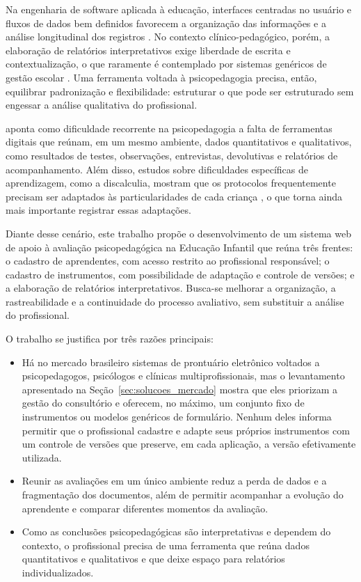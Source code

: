 Na engenharia de software aplicada à educação, interfaces centradas no usuário e fluxos de dados bem definidos favorecem a organização das informações e a análise longitudinal dos registros \cite{Lemes_Dias_Oliveira_2023}. No contexto clínico-pedagógico, porém, a elaboração de relatórios interpretativos exige liberdade de escrita e contextualização, o que raramente é contemplado por sistemas genéricos de gestão escolar \cite{junior2024_gestao_escolar}. Uma ferramenta voltada à psicopedagogia precisa, então, equilibrar padronização e flexibilidade: estruturar o que pode ser estruturado sem engessar a análise qualitativa do profissional.

 aponta como dificuldade recorrente na psicopedagogia a falta de ferramentas digitais que reúnam, em um mesmo ambiente, dados quantitativos e qualitativos, como resultados de testes, observações, entrevistas, devolutivas e relatórios de acompanhamento. Além disso, estudos sobre dificuldades específicas de aprendizagem, como a discalculia, mostram que os protocolos frequentemente precisam ser adaptados às particularidades de cada criança \cite{tavares2022_instrumentos_psicopedagogicos}, o que torna ainda mais importante registrar essas adaptações.

Diante desse cenário, este trabalho propõe o desenvolvimento de um sistema web de apoio à avaliação psicopedagógica na Educação Infantil que reúna três frentes: o cadastro de aprendentes, com acesso restrito ao profissional responsável; o cadastro de instrumentos, com possibilidade de adaptação e controle de versões; e a elaboração de relatórios interpretativos. Busca-se melhorar a organização, a rastreabilidade e a continuidade do processo avaliativo, sem substituir a análise do profissional.

O trabalho se justifica por três razões principais:

\begin{itemize}
    \item Há no mercado brasileiro sistemas de prontuário eletrônico voltados a psicopedagogos, psicólogos e clínicas multiprofissionais, mas o levantamento apresentado na Seção~\ref{sec:solucoes_mercado} mostra que eles priorizam a gestão do consultório e oferecem, no máximo, um conjunto fixo de instrumentos ou modelos genéricos de formulário. Nenhum deles informa permitir que o profissional cadastre e adapte seus próprios instrumentos com um controle de versões que preserve, em cada aplicação, a versão efetivamente utilizada.
    \item Reunir as avaliações em um único ambiente reduz a perda de dados e a fragmentação dos documentos, além de permitir acompanhar a evolução do aprendente e comparar diferentes momentos da avaliação.
    \item Como as conclusões psicopedagógicas são interpretativas e dependem do contexto, o profissional precisa de uma ferramenta que reúna dados quantitativos e qualitativos e que deixe espaço para relatórios individualizados.
\end{itemize}

